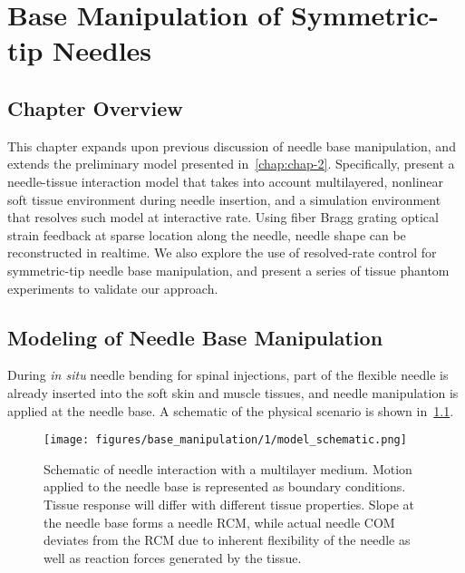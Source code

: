 \chapter{Base Manipulation of Symmetric-tip Needles} \label{chap:chap-3}

\section{Chapter Overview}
\label{sec:chap-3-overview}

This chapter expands upon previous discussion of needle base manipulation, and extends the preliminary model presented in~\cref{chap:chap-2}. Specifically,  present a needle-tissue interaction model that takes into account multilayered, nonlinear soft tissue environment during needle insertion, and a simulation environment that resolves such model at interactive rate. Using fiber Bragg grating optical strain feedback at sparse location along the needle, needle shape can be reconstructed in realtime. We also explore the use of resolved-rate control for symmetric-tip needle base manipulation, and present a series of tissue phantom experiments to validate our approach.


\section{Modeling of Needle Base Manipulation}
\label{sec:chap-3-model}

During \textit{in situ} needle bending for spinal injections, part of the flexible needle is already inserted into the soft skin and muscle tissues, and needle manipulation is applied at the needle base. A schematic of the physical scenario is shown in~\cref{fig:chap-3-model-schematic}.

\begin{figure}[t]
  \centering
  \texttt{[image: figures/base\_manipulation/1/model\_schematic.png]}
  \caption{Schematic of needle interaction with a multilayer medium. Motion applied to the needle base is represented as boundary conditions. Tissue response will differ with different tissue properties. Slope at the needle base forms a needle RCM, while actual needle COM deviates from the RCM due to inherent flexibility of the needle as well as reaction forces generated by the tissue.}
  \label{fig:chap-3-model-schematic}
\end{figure}

